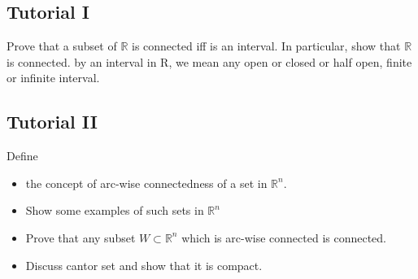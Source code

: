\documentclass{article}
\begin{document}
 \subsection{Tutorial I}
 Prove that a subset of $\mathbb{R}$ is connected iff is an interval. In particular, show that $\mathbb{R}$ is connected.
by an interval in R, we mean any open or closed or half open, finite or infinite interval.

\subsection{Tutorial II}
Define 
\begin{itemize}
    \item the concept of arc-wise connectedness of a set in $\mathbb{R}^n$.
    \item Show some examples of such sets in $\mathbb{R}^n$
    \item Prove that any subset $W \subset \mathbb{R}^n$ which is arc-wise connected is connected.
    \item  Discuss cantor set and show that it is compact.
\end{itemize}\\
\end{document}
